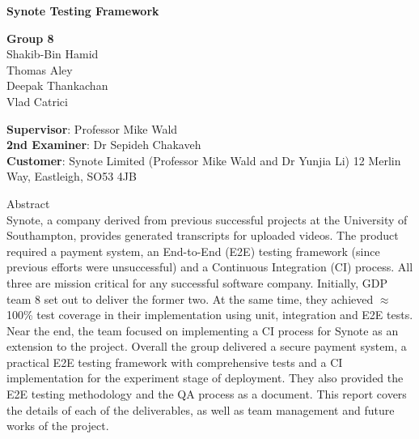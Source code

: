 \thispagestyle{plain}


\begin{center}

    {\selectfont

    \textbf{Synote Testing Framework}\\

    \vspace{1cm}

    \textbf{Group 8} \\
	Shakib-Bin Hamid \\ Thomas Aley \\ Deepak Thankachan \\ Vlad Catrici

    \vspace{2cm}
	}
\end{center}


{\selectfont
\textbf{Supervisor}: Professor Mike Wald\\
\textbf{2nd Examiner}: Dr Sepideh Chakaveh\\
\textbf{Customer}: Synote Limited (Professor Mike Wald and Dr Yunjia Li) 12 Merlin Way, Eastleigh, SO53 4JB
}

\vspace{1cm}

\begin{framed}

{\selectfont
Abstract\\

Synote, a company derived from previous successful projects at the University of Southampton, provides generated transcripts for uploaded videos. The product required a payment system, an End-to-End (E2E) testing framework (since previous efforts were unsuccessful) and a Continuous Integration (CI) process. All three are mission critical for any successful software company. Initially, GDP team 8 set out to deliver the former two. At the same time, they achieved $\approx$ 100\% test coverage in their implementation using unit, integration and E2E tests. Near the end, the team focused on implementing a CI process for Synote as an extension to the project. Overall the group delivered a secure payment system, a practical E2E testing framework with comprehensive tests and a CI implementation for the experiment stage of deployment. They also provided the E2E testing methodology and the QA process as a document. This report covers the details of each of the deliverables, as well as team management and future works of the project.
}
\end{framed}

\restoregeometry

\large
